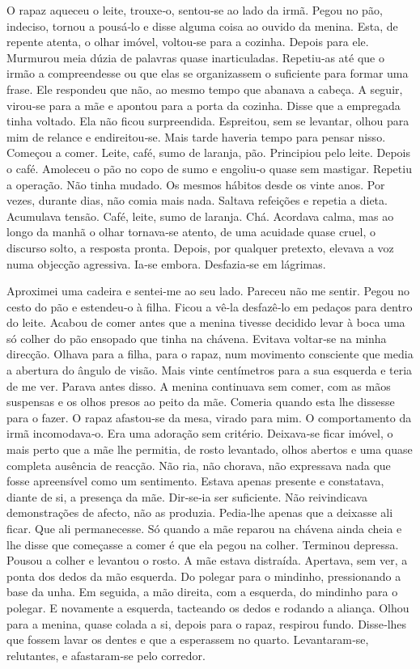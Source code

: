 O rapaz aqueceu o leite, trouxe­‑o, sentou­‑se ao lado da irmã. Pegou no
pão, indeciso, tornou a pousá­‑lo e disse alguma coisa ao ouvido da
menina. Esta, de repente atenta, o olhar imóvel, voltou­‑se para a
cozinha. Depois para ele. Murmurou meia dúzia de palavras quase
inarticuladas. Repetiu­‑as até que o irmão a compreendesse ou que elas
se organizassem o suficiente para formar uma frase. Ele respondeu que
não, ao mesmo tempo que abanava a cabeça. A seguir, virou­‑se para a mãe
e apontou para a porta da cozinha. Disse que a empregada tinha voltado.
Ela não ficou surpreendida. Espreitou, sem se levantar, olhou para mim
de relance e endireitou­‑se. Mais tarde haveria tempo para pensar nisso.
Começou a comer. Leite, café, sumo de laranja, pão. Principiou pelo
leite. Depois o café. Amoleceu o pão no copo de sumo e engoliu­‑o quase
sem mastigar. Repetiu a operação. Não tinha mudado. Os mesmos hábitos
desde os vinte anos. Por vezes, durante dias, não comia mais nada.
Saltava refeições e repetia a dieta. Acumulava tensão. Café, leite, sumo
de laranja. Chá. Acordava calma, mas ao longo da manhã o olhar
tornava­‑se atento, de uma acuidade quase cruel, o discurso solto, a
resposta pronta. Depois, por qualquer pretexto, elevava a voz numa
objecção agressiva. Ia­‑se embora. Desfazia­‑se em lágrimas.

Aproximei uma cadeira e sentei­‑me ao seu lado. Pareceu não me sentir.
Pegou no cesto do pão e estendeu­‑o à filha. Ficou a vê­‑la desfazê­‑lo
em pedaços para dentro do leite. Acabou de comer antes que a menina
tivesse decidido levar à boca uma só colher do pão ensopado que tinha na
chávena. Evitava voltar­‑se na minha direcção. Olhava para a filha, para
o rapaz, num movimento consciente que media a abertura do ângulo de
visão. Mais vinte centímetros para a sua esquerda e teria de me ver.
Parava antes disso. A menina continuava sem comer, com as mãos suspensas
e os olhos presos ao peito da mãe. Comeria quando esta lhe dissesse para
o fazer. O rapaz afastou­‑se da mesa, virado para mim. O comportamento
da irmã incomodava­‑o. Era uma adoração sem critério. Deixava­‑se ficar
imóvel, o mais perto que a mãe lhe permitia, de rosto levantado, olhos
abertos e uma quase completa ausência de reacção. Não ria, não chorava,
não expressava nada que fosse apreensível como um sentimento. Estava
apenas presente e constatava, diante de si, a presença da mãe.
Dir­‑se­‑ia ser suficiente. Não reivindicava demonstrações de afecto,
não as produzia. Pedia­‑lhe apenas que a deixasse ali ficar. Que ali
permanecesse. Só quando a mãe reparou na chávena ainda cheia e lhe disse
que começasse a comer é que ela pegou na colher. Terminou depressa.
Pousou a colher e levantou o rosto. A mãe estava distraída. Apertava,
sem ver, a ponta dos dedos da mão esquerda. Do polegar para o mindinho,
pressionando a base da unha. Em seguida, a mão direita, com a esquerda,
do mindinho para o polegar. E novamente a esquerda, tacteando os dedos e
rodando a aliança. Olhou para a menina, quase colada a si, depois para o
rapaz, respirou fundo. Disse­‑lhes que fossem lavar os dentes e que a
esperassem no quarto. Levantaram­‑se, relutantes, e afastaram­‑se pelo
corredor.

